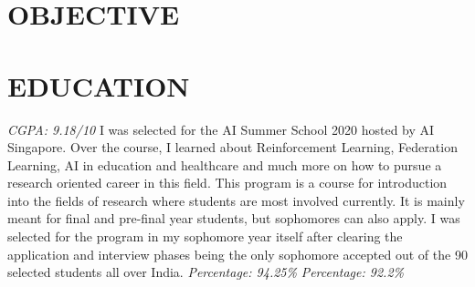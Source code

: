 \documentclass[10pt,a4paper,sans]{moderncv}        %
\begin{document}
\makecvtitle

\section{OBJECTIVE}

\section{EDUCATION}
{\textit{CGPA: 9.18/10}}{}  %
{I was selected for the AI Summer School 2020 hosted by AI Singapore. Over the course, I learned about Reinforcement Learning, Federation Learning, AI in education and healthcare and much more on how to pursue a research oriented career in this field.}
{This program is a course for introduction into the fields of research where students are most involved currently. It is mainly meant for final and pre-final year students, but sophomores can also apply. I was selected for the program in my sophomore year itself after clearing the application and interview phases  being the only sophomore accepted out of the 90 selected students all over India.}{}
{\textit{Percentage: 94.25\%  }}{}  %
{\textit{Percentage: 92.2\%  }}{}  %
\end{document}
